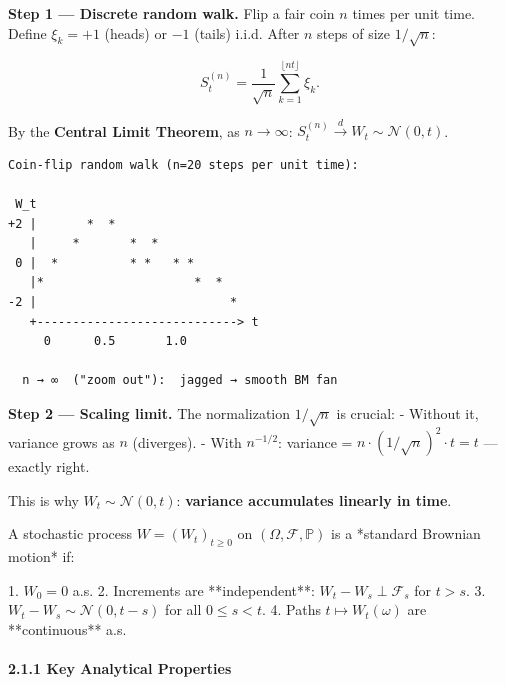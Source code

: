 \documentclass[11pt,a4paper]{article}
\begin{document}
\textbf{Step 1 --- Discrete random walk.} Flip a fair coin \(n\) times per unit time. Define \(\xi_k = +1\) (heads) or \(-1\) (tails) i.i.d. After \(n\) steps of size \(1/\sqrt{n}\):

\[S^{(n)}_t = \frac{1}{\sqrt{n}}\sum_{k=1}^{\lfloor nt \rfloor} \xi_k.\]

By the \textbf{Central Limit Theorem}, as \(n\to\infty\): \(S^{(n)}_t \xrightarrow{d} W_t \sim \mathcal{N}(0,t)\).

\begin{verbatim}
Coin-flip random walk (n=20 steps per unit time):

 W_t
+2 |       *  *
   |     *       *  *
 0 |  *          * *   * *
   |*                     *  *
-2 |                           *
   +----------------------------> t
     0      0.5       1.0

  n → ∞  ("zoom out"):  jagged → smooth BM fan
\end{verbatim}

\textbf{Step 2 --- Scaling limit.} The normalization \(1/\sqrt{n}\) is crucial: - Without it, variance grows as \(n\) (diverges). - With \(n^{-1/2}\): variance = \(n \cdot (1/\sqrt{n})^2 \cdot t = t\) --- exactly right.

This is why \(W_t \sim \mathcal{N}(0,t)\): \textbf{variance accumulates linearly in time}.

\begin{tcolorbox}[colback=defbg!60,colframe=optblue,fonttitle=\bfseries\sffamily,title={\textsf{\textbf{Definition}} — Definition — Wiener Process},breakable]
A stochastic process $W = (W_t)_{t\ge 0}$ on $(\Omega,\mathcal{F},\mathbb{P})$
is a *standard Brownian motion* if:

1. $W_0 = 0$ a.s.
2. Increments are **independent**: $W_t - W_s \perp \mathcal{F}_s$ for $t>s$.
3. $W_t - W_s \sim \mathcal{N}(0, t-s)$ for all $0\le s<t$.
4. Paths $t\mapsto W_t(\omega)$ are **continuous** a.s.
\end{tcolorbox}

\paragraph{2.1.1 Key Analytical Properties}\label{key-analytical-properties}
\end{document}
